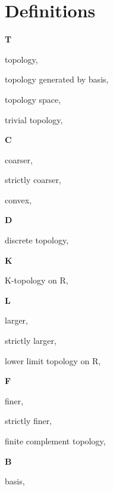 \section*{Definitions}

\begin{multicols}{2}

\vspace{1em}\large{\textbf{T}}

topology, \pageref{def:Topology}

topology generated by basis, \pageref{def:TopologyGeneratedByBasis}

topology space, \pageref{def:TopologySpace}

trivial topology, \pageref{def:TrivialTopology}

\vspace{1em}\large{\textbf{C}}

coarser, \pageref{def:Comparable}

\hspace{2em}strictly coarser, \pageref{def:Comparable}

convex, \pageref{def:Convex}

\vspace{1em}\large{\textbf{D}}

discrete topology, \pageref{def:DiscreteTopology}

\vspace{1em}\large{\textbf{K}}

K-topology on R, \pageref{def:KTopologyOnTheRealLine}

\vspace{1em}\large{\textbf{L}}

larger, \pageref{def:Comparable}

\hspace{2em}strictly larger, \pageref{def:Comparable}

lower limit topology on R, \pageref{def:LowerLimitTopologyOnTheRealLine}

\vspace{1em}\large{\textbf{F}}

finer, \pageref{def:Comparable}

\hspace{2em}strictly finer, \pageref{def:Comparable}

finite complement topology, \pageref{def:FiniteComplementTopology}

\vspace{1em}\large{\textbf{B}}

basis, \pageref{def:Basis}


\end{multicols}
